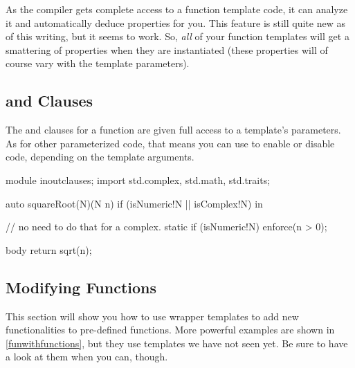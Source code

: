 As the compiler gets complete access to a function template code, it can analyze it and automatically deduce properties for you. This feature is still quite new as of this writing, but it seems to work. So, \emph{all} of your function templates will get a smattering of properties when they are instantiated (these properties will of course vary with the template parameters).

\subsection{\texorpdfstring{ and  Clauses}
                           {in and out Clauses}}
\label{inandoutclauses}

The  and  clauses for a function are given full access to a template's parameters. As for other parameterized code, that means you can use  to enable or disable code, depending on the template arguments.

\begin{dcode}
module inoutclauses;
import std.complex, std.math, std.traits;

auto squareRoot(N)(N n) if (isNumeric!N || isComplex!N)
in 
{
    // no need to do that for a complex.
    static if (isNumeric!N)
        enforce(n > 0);
    
}
body
{
    return sqrt(n);
}
\end{dcode}

\subsection{Modifying Functions}\label{modifyingfunctions}

This section will show you how to use wrapper templates to add new functionalities to pre-defined functions. More powerful examples are shown in \autoref{funwithfunctions}, but they use templates we have not seen yet. Be sure to have a look at them when you can, though.


